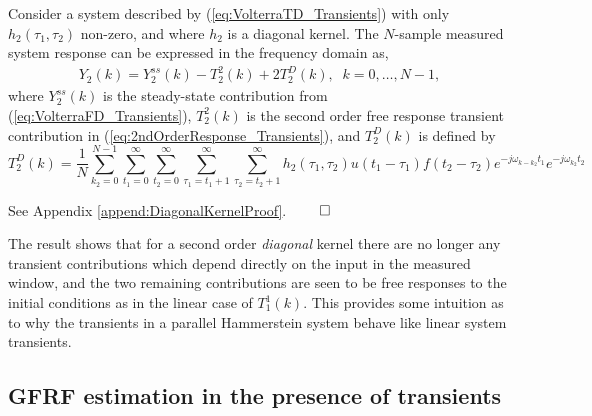 \begin{thm}
\label{thm:FreqResponse_DiagonalKernel2}
Consider a system described by (\ref{eq:VolterraTD_Transients}) with only $h_2(\tau_1,\tau_2)$ non-zero, and where $h_2$ is a diagonal kernel. The $N$-sample measured system response can be expressed in the frequency domain as, 
\begin{align}
Y_2(k) = Y_2^{ss}(k) - T_2^2(k) + 2 T_2^{D}(k),  \; \; k = 0,\hdots,N-1,
\end{align}
where $Y_2^{ss}(k)$ is the steady-state contribution from (\ref{eq:VolterraFD_Transients}), $T_2^2(k)$ is the second order free response transient contribution in (\ref{eq:2ndOrderResponse_Transients}), and $T_2^D(k)$ is defined by
\begin{equation}
T_2^D(k) = \frac{1}{N} \sum\limits_{k_2=0}^{N-1} \sum\limits_{t_1=0}^{\infty} \sum\limits_{t_2=0}^{\infty} \sum\limits_{\tau_1=t_1+1}^{\infty} \sum\limits_{\tau_2=t_2+1}^{\infty} h_2(\tau_1,\tau_2) u(t_1-\tau_1) f(t_2-\tau_2) e^{-j \omega_{k-k_2}t_1} e^{-j \omega_{k_2} t_2} \label{eq:T2D_transients}
\end{equation}
\end{thm}

\begin{proof*}
See Appendix \ref{append:DiagonalKernelProof}. \hfill $\qed$
\end{proof*}

The result shows that for a second order \emph{diagonal} kernel there are no longer any transient contributions which depend directly on the input in the measured window, and the two remaining contributions are seen to be free responses to the initial conditions as in the linear case of $T_1^1(k)$. This provides some intuition as to why the transients in a parallel Hammerstein system behave like linear system transients. 

\subsection{GFRF estimation in the presence of transients} 

